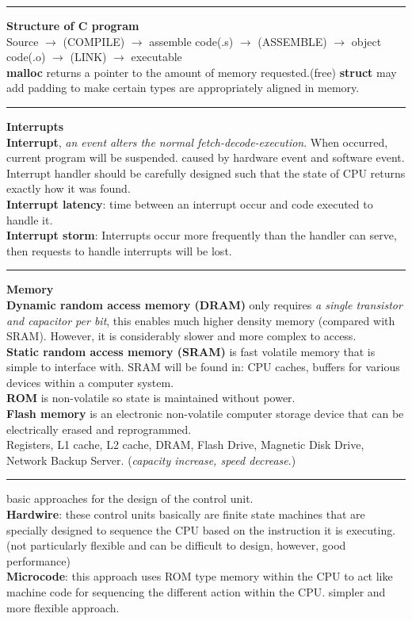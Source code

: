 \documentclass[8pt,a4paper,landscape]{article}
\newcommand{\topic}[1]{\textbf{\large #1}}
\begin{document}
\begin{spacing}{-1}
\begin{multicols*}{3}
    \hrule \noindent
    \topic{Structure of C program} \\
    Source  $\rightarrow$  (COMPILE) $\rightarrow$   assemble code(.s) $\rightarrow$   
    (ASSEMBLE) $\rightarrow$  object code(.o) $\rightarrow$  (LINK) $\rightarrow$  executable \\
    \textbf{malloc} returns a pointer to the amount of memory requested.(free)
    \textbf{struct} may add padding to make certain types are appropriately aligned in memory.
    
    \hrule \noindent
    \topic{Interrupts} \\
    \textbf{Interrupt}, \textit{an event alters the normal fetch-decode-execution}. When occurred, current program will be suspended. caused by hardware event and software event. \\
    Interrupt handler should be carefully designed such that the state of CPU returns exactly how it was found. \\
    \textbf{Interrupt latency}: time between an interrupt occur and code executed to handle it. \\
    \textbf{Interrupt storm}: Interrupts occur more frequently than the handler can serve, then requests to handle interrupts will be lost.

    \hrule \noindent
    \topic{Memory} \\
    \textbf{Dynamic random access memory (DRAM)} only requires \textit{a single transistor and capacitor per bit}, this enables much higher density memory (compared with SRAM). However, it is considerably slower and more complex to access. \\
    \textbf{Static random access memory (SRAM)} is fast volatile memory that is simple to interface with. SRAM will be found in: CPU caches, buffers for various devices within a computer system. \\
    \textbf{ROM} is non-volatile so state is maintained without power. \\
    \textbf{Flash memory} is an electronic non-volatile computer storage device that can be electrically erased and reprogrammed. \\
Registers, L1 cache, L2 cache, DRAM, Flash Drive, Magnetic Disk Drive, Network Backup Server. 
    (\textit{capacity increase, speed decrease}.)

\hrule {} basic approaches for the design of the control unit. \\
\textbf{Hardwire}: these control units basically are finite state machines that are specially designed to sequence the CPU based on the instruction it is executing. (not particularly flexible and can be difficult to design, however, good performance) \\
\textbf{Microcode}: this approach uses ROM type memory within the CPU to act like machine code for sequencing the different action within the CPU. simpler and more flexible approach. \\


\end{multicols*}
\end{spacing}
\end{document}
